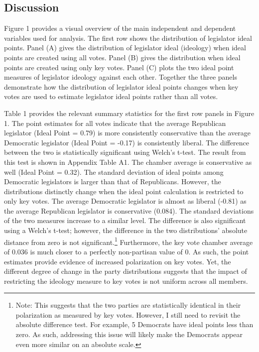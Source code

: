\documentclass[10pt,letterpaper]{article}
\begin{document}
\subsection{Discussion}
Figure 1 provides a visual overview of the main independent and dependent variables used for analysis. The first row shows the distribution of legislator ideal points. Panel (A) gives the distribution of legislator ideal (ideology) when ideal points are created using all votes. Panel (B) gives the distribution when ideal points are created using only key votes. Panel (C) plots the two ideal point measures of legislator ideology against each other. Together the three panels demonstrate how the distribution of legislator ideal points changes when key votes are used to estimate legislator ideal points rather than all votes.
 
Table 1 provides the relevant summary statistics for the first row panels in Figure 1. The point estimates for all votes indicate that the average Republican legislator (Ideal Point = 0.79) is more consistently conservative than the average Democratic legislator (Ideal Point = -0.17) is consistently liberal. The difference between the two is statistically significant using Welch's t-test. The result from this test is shown in Appendix Table A1. The chamber average is conservative as well (Ideal Point = 0.32). The standard deviation of ideal points among Democratic legislators is larger than that of Republicans. However, the distributions distinctly change when the ideal point calculation is restricted to only key votes. The average Democratic legislator is almost as liberal (-0.81) as the average Republican legislator is conservative (0.084). The standard deviations of the two measures increase to a similar level. The difference is also significant using a Welch's t-test; however, the difference in the two distributions' absolute distance from zero is not significant.\footnote{Note: This suggests that the two parties are statistically identical in their polarization as measured by key votes. However, I still need to revisit the absolute difference test. For example, 5 Democrats have ideal points less than zero. As such, addressing this issue will likely make the Democrats appear even more similar on an absolute scale.} Furthermore, the key vote chamber average of 0.036 is much closer to a perfectly non-partisan value of 0. As such, the point estimates provide evidence of increased polarization on key votes. Yet, the different degree of change in the party distributions suggests that the impact of restricting the ideology measure to key votes is not uniform across all members.
\end{document}
